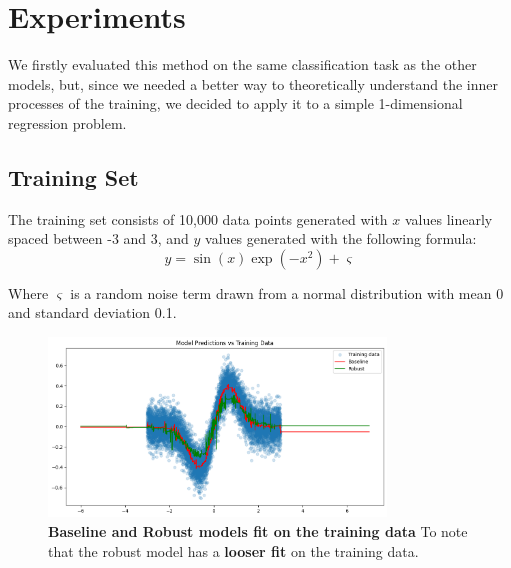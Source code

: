 \section{Experiments}
We firstly evaluated this method on the same classification task as the other models, but, since we needed a better way to theoretically understand the inner processes of the training, we decided to apply it to a simple 1-dimensional regression problem.

\subsection{Training Set}
The training set consists of 10,000 data points generated with $x$ values linearly spaced between -3 and 3, and $y$ values generated with the following formula:
\begin{equation}
    y = \sin(x)\exp(-x^2) + \varsigma
\end{equation}

Where $\varsigma$ is a random noise term drawn from a normal distribution with mean 0 and standard deviation 0.1.

\begin{figure}[H]
    \centering
    \includegraphics[width=0.8\textwidth]{assets/fit_on_train.png} 
    \caption{\textbf{Baseline and Robust models fit on the training data} To note that the robust model has a \textbf{looser fit} on the training data.}
    \label{fig:fit-train}
\end{figure}

